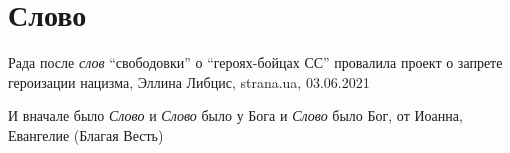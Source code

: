  
 
 
 
 
\chapter{Слово}

Рада после \emph{слов} \enquote{свободовки} о \enquote{героях-бойцах СС} провалила
проект о запрете героизации нацизма,
Эллина Либцис, strana.ua, 03.06.2021

И вначале было \emph{Слово} и \emph{Слово} было у Бога и \emph{Слово} было Бог,
от Иоанна, Евангелие (Благая Весть)
